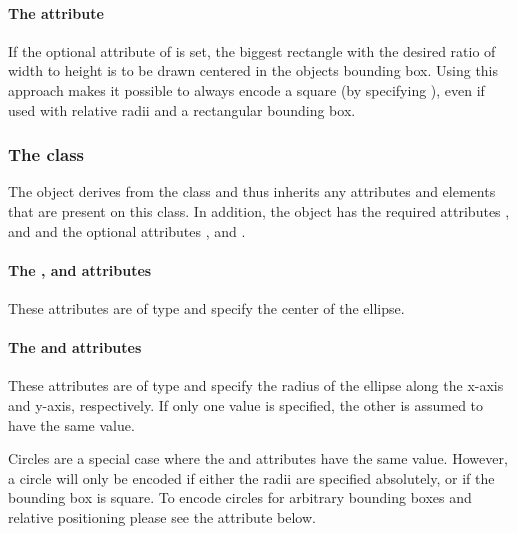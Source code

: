 \paragraph{The \fixttspace{} attribute}
If the optional  attribute of  is set, the biggest 
rectangle with the desired ratio of width to height is to be drawn centered in the 
objects bounding box. Using this approach makes it possible to always encode a 
square (by specifying ), even if used with relative radii and a rectangular bounding box. 


\subsubsection{The  class}
\label{renderellipse-class}


The \RenderEllipse object derives from the \GraphicalPrimitiveTwoD class
and thus inherits any attributes and elements that are present on this
class.
In addition, the \RenderEllipse object has the required attributes , 
 and  and the optional attributes ,  and .

\paragraph{The \fixttspace{}, \fixttspace{} and \fixttspace{}  attributes}

These attributes are of type
\RelAbsVector and specify the center of the ellipse.

\paragraph{The \fixttspace{} and \fixttspace{} attributes}

These attributes are of type
\RelAbsVector and specify the radius of the ellipse along the x-axis and y-axis, 
respectively. If only one value is specified, the other is assumed to have the same value. 

Circles are a special case where the  and  attributes have the same value. However, 
a circle will only be encoded if either the radii are specified absolutely, or if the bounding box is square. 
To encode circles for arbitrary bounding boxes and relative positioning please see the  
attribute below.

